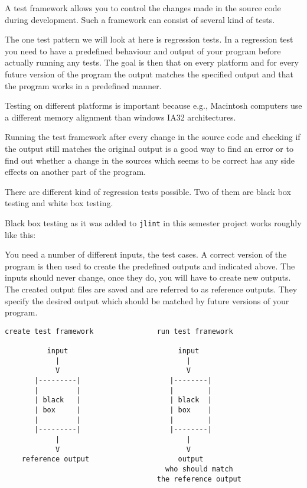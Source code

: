 \documentclass[11pt,twoside,a4paper,draft]{article}
\begin{document}
A test framework allows you to control the changes made in the source code
during development. Such a framework can consist of several kind of tests.


The one test pattern we will look at here is regression tests. In a regression 
test you need to have a predefined behaviour and output of your program before
actually running any tests. The goal is then that on every platform and for 
every future version of the program the output matches the specified output 
and that the program works in a predefined manner.


Testing on different platforms is important because e.g., Macintosh computers 
use a different memory alignment than windows IA32 architectures.


Running the test framework after every change in the source code and checking
if the output still matches the original output is a good way to find an error
or to find out whether a change in the sources which seems to be correct has 
any side effects on another part of the program.


There are different kind of regression tests possible. Two of them are black
box testing and white box testing.


Black box testing as it was added to \texttt{jlint} in this semester project 
works roughly like this:

You need a number of different inputs, the test cases. A correct version of 
the program is then used to create the predefined outputs and indicated above.
The inputs should never change, once they do, you will have to create new 
outputs. The created output files are saved and are referred to as reference 
outputs. They specify the desired output which should be matched by future 
versions of your program.

\begin{verbatim}
create test framework               run test framework

          input                          input
            |                              |
            V                              V
       |---------|                     |--------|
       |         |                     |        |
       | black   |                     | black  |
       | box     |                     | box    |
       |         |                     |        |
       |---------|                     |--------|
            |                              |
            V                              V
    reference output                     output
                                      who should match
                                    the reference output
\end{verbatim}
\end{document}

